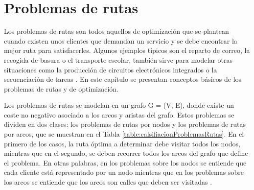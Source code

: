 \chapter{Problemas de rutas}
\label{chap4}
\ifpdf
  \graphicspath{{Chapter4/Chapter4Figs/PNG/}{Chapter4/Chapter4Figs/PDF/}{Chapter4/Chapter4Figs/}}
\else
  \graphicspath{{Chapter4/Chapter4Figs/EPS/}{Chapter4/Chapter4Figs/}}
\fi


Los problemas de rutas son todos aquellos de optimización que se plantean cuando existen unos clientes que demandan un servicio y se debe encontrar la mejor ruta para satisfacerles. Algunos ejemplos típicos son el reparto de correo, la recogida de basura o el transporte escolar, también sirve para modelar otras situaciones como la producción de circuitos electrónicos integrados o la secuenciación de tareas \citep{CalvinoM2011CooperacionPanoramica}. En este capítulo se presentan conceptos básicos de los problemas de rutas y de optimización.

Los problemas de rutas se modelan en un grafo G = (V, E), donde existe un coste no negativo asociado a los arcos y aristas del grafo. Estos problemas se dividen en dos clases: los problemas de rutas por nodos y los problemas de rutas por arcos, que se muestran en el Tabla \ref{table:calsifiacionProblemasRutas}. En el primero de los casos, la ruta óptima a determinar debe visitar todos los nodos, mientras que en el segundo, se deben recorrer todos los arcos del grafo que define el problema. En otras palabras, en los problemas sobre los nodos se entiende que cada cliente está representado por un nodo mientras que en los problemas sobre los arcos se entiende que los arcos son calles que deben ser visitadas \citep{CalvinoM2011CooperacionPanoramica}.

